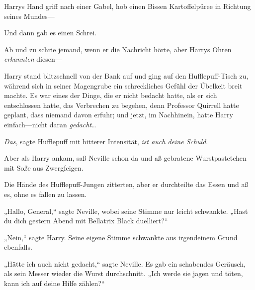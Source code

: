 Harrys Hand griff nach einer Gabel, hob einen Bissen Kartoffelpüree in Richtung seines Mundes—

Und dann gab es einen Schrei.

Ab und zu schrie jemand, wenn er die Nachricht hörte, aber Harrys Ohren \emph{erkannten} diesen—

Harry stand blitzschnell von der Bank auf und ging auf den Hufflepuff-Tisch zu, während sich in seiner Magengrube ein schreckliches Gefühl der Übelkeit breit machte. Es war eines der Dinge, die er nicht bedacht hatte, als er sich entschlossen hatte, das Verbrechen zu begehen, denn Professor Quirrell hatte geplant, dass niemand davon erfuhr; und jetzt, im Nachhinein, hatte Harry einfach—nicht daran \emph{gedacht}…

\emph{Das}, sagte Hufflepuff mit bitterer Intensität, \emph{ist auch deine Schuld}.

Aber als Harry ankam, saß Neville schon da und aß gebratene Wurstpastetchen mit Soße aus Zwergfeigen.

Die Hände des Hufflepuff-Jungen zitterten, aber er durchteilte das Essen und aß es, ohne es fallen zu lassen.

„Hallo, General,“ sagte Neville, wobei seine Stimme nur leicht schwankte. „Hast du dich gestern Abend mit Bellatrix Black duelliert?“

„Nein,“ sagte Harry. Seine eigene Stimme schwankte aus irgendeinem Grund ebenfalls.

„Hätte ich auch nicht gedacht,“ sagte Neville. Es gab ein schabendes Geräusch, als sein Messer wieder die Wurst durchschnitt. „Ich werde sie jagen und töten, kann ich auf deine Hilfe zählen?“

